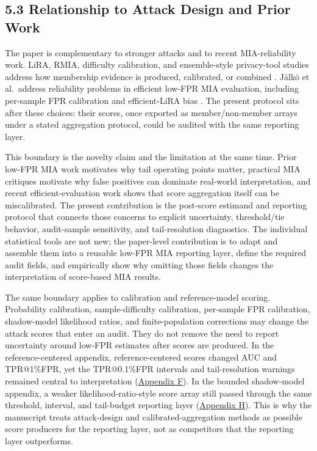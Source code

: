\documentclass[
  10pt,
  twocolumn]{article}
\begin{document}
\hypertarget{relationship-to-attack-design-and-prior-work}{%
\subsection{5.3 Relationship to Attack Design and Prior Work}\label{relationship-to-attack-design-and-prior-work}}

The paper is complementary to stronger attacks and to recent MIA-reliability work. LiRA, RMIA, difficulty calibration, and ensemble-style privacy-tool studies address how membership evidence is produced, calibrated, or combined \cite{ref-3,ref-4,ref-5,ref-15}. Jälkö et al.~address reliability problems in efficient low-FPR MIA evaluation, including per-sample FPR calibration and efficient-LiRA bias \cite{ref-12}. The present protocol sits after these choices: their scores, once exported as member/non-member arrays under a stated aggregation protocol, could be audited with the same reporting layer.

This boundary is the novelty claim and the limitation at the same time. Prior low-FPR MIA work motivates why tail operating points matter, practical MIA critiques motivate why false positives can dominate real-world interpretation, and recent efficient-evaluation work shows that score aggregation itself can be miscalibrated. The present contribution is the post-score estimand and reporting protocol that connects those concerns to explicit uncertainty, threshold/tie behavior, audit-sample sensitivity, and tail-resolution diagnostics. The individual statistical tools are not new; the paper-level contribution is to adapt and assemble them into a reusable low-FPR MIA reporting layer, define the required audit fields, and empirically show why omitting those fields changes the interpretation of score-based MIA results.

The same boundary applies to calibration and reference-model scoring. Probability calibration, sample-difficulty calibration, per-sample FPR calibration, shadow-model likelihood ratios, and finite-population corrections may change the attack scores that enter an audit. They do not remove the need to report uncertainty around low-FPR estimates after scores are produced. In the reference-centered appendix, reference-centered scores changed AUC and TPR@1\%FPR, yet the TPR@0.1\%FPR intervals and tail-resolution warnings remained central to interpretation (\protect\hyperlink{appendix-f-reference-centered-score-check}{Appendix F}). In the bounded shadow-model appendix, a weaker likelihood-ratio-style score array still passed through the same threshold, interval, and tail-budget reporting layer (\protect\hyperlink{appendix-h-bounded-shadow-model-score-check}{Appendix H}). This is why the manuscript treats attack-design and calibrated-aggregation methods as possible score producers for the reporting layer, not as competitors that the reporting layer outperforms.
\end{document}
